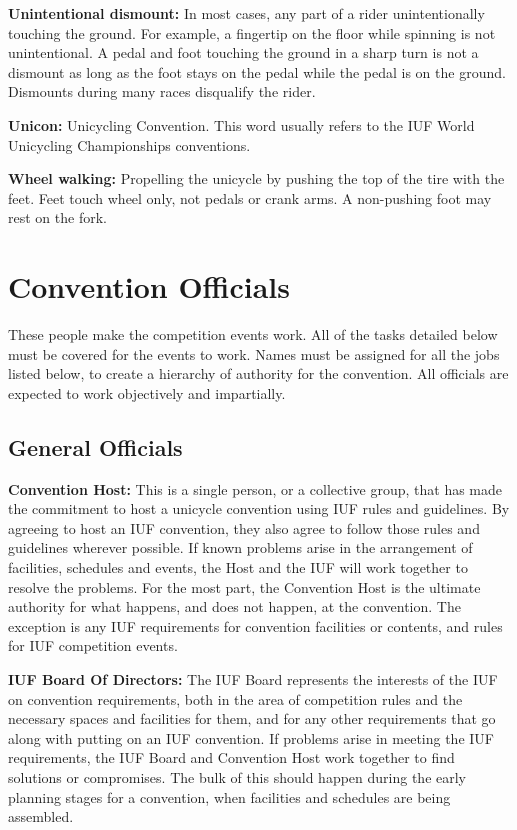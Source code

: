\textbf{Unintentional dismount:} In most cases, any part of a rider unintentionally touching the ground.
For example, a fingertip on the floor while spinning is not unintentional.
A pedal and foot touching the ground in a sharp turn is not a dismount as long as the foot stays on the pedal while the pedal is on the ground.
Dismounts during many races disqualify the rider.

\textbf{Unicon:} Unicycling Convention.
This word usually refers to the IUF World Unicycling Championships conventions.

\textbf{Wheel walking:} Propelling the unicycle by pushing the top of the tire with the feet.
Feet touch wheel only, not pedals or crank arms.
A non-pushing foot may rest on the fork.


\section{Convention Officials}
These people make the competition events work.
All of the tasks detailed below must be covered for the events to work.
Names must be assigned for all the jobs listed below, to create a hierarchy of authority for the convention.
All officials are expected to work objectively and impartially.

\subsection{General Officials}
\textbf{Convention Host:} This is a single person, or a collective group, that has made the commitment to host a unicycle convention using IUF rules and guidelines.
By agreeing to host an IUF convention, they also agree to follow those rules and guidelines wherever possible.
If known problems arise in the arrangement of facilities, schedules and events, the Host and the IUF will work together to resolve the problems.
For the most part, the Convention Host is the ultimate authority for what happens, and does not happen, at the convention.
The exception is any IUF requirements for convention facilities or contents, and rules for IUF competition events.

\textbf{IUF Board Of Directors:} The IUF Board represents the interests of the IUF on convention requirements, both in the area of competition rules and the necessary spaces and facilities for them, and for any other requirements that go along with putting on an IUF convention.
If problems arise in meeting the IUF requirements, the IUF Board and Convention Host work together to find solutions or compromises.
The bulk of this should happen during the early planning stages for a convention, when facilities and schedules are being assembled.

